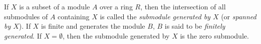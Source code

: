 If $X$ is a subset of a module $A$ over a ring $R$, then the intersection of all submodules of $A$ containing $X$ is called the \emph{submodule generated by $X$} (or \emph{spanned by $X$}). If $X$ is finite and generates the module $B$, $B$ is said to be \emph{finitely generated}. If $X = \emptyset$, then the submodule generated by $X$ is the zero submodule.
